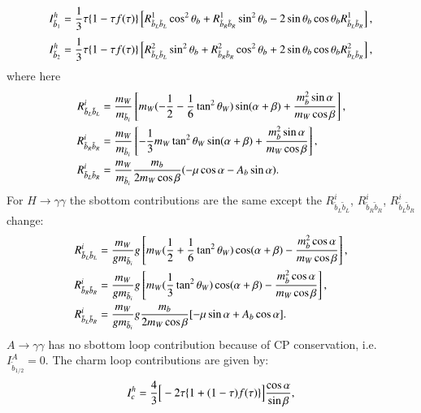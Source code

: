\documentclass[final,3p,times]{elsarticle}
\begin{document}
\begin{equation}
I_{\tilde{b}_1}^h = {1 \over 3}\tau \{1- \tau f(\tau)\}\left[R_{\tilde{b}_L \tilde{b}_L}^1 \cos^2 \theta_b + R_{\tilde{b}_R \tilde{b}_R}^1 \sin^2 \theta_b - 2\sin\theta_b \cos\theta_b R_{\tilde{b}_L \tilde{b}_R}^1\right],
\end{equation}
\begin{equation}
I_{\tilde{b}_2}^h = {1 \over 3}\tau\{1-\tau f(\tau)\}\left[R_{\tilde{b}_L \tilde{b}_L}^2 \sin^2 \theta_b + R_{\tilde{b}_R \tilde{b}_R}^2 \cos^2 \theta_b + 2\sin\theta_b \cos\theta_b R_{\tilde{b}_L \tilde{b}_R}^2\right],
\end{equation}
where here
\begin{align} 
R_{\tilde{b}_L \tilde{b}_L}^i &= {m_{W} \over m_{\tilde{b}_i}} \left[m_W (-{1 \over 2} - {1 \over 6}\tan^2 \theta_W)\sin(\alpha+\beta) + {m_{b}^2 \sin\alpha \over m_{W} \cos \beta}\right], \\
R_{\tilde{b}_R \tilde{b}_R}^i &= {m_{W} \over m_{\tilde{b}_i}}\left[-{1 \over 3}m_W \tan^2 \theta_W \sin(\alpha + \beta) + {m_{b}^2 \sin\alpha \over m_W \cos\beta}\right], \\
R_{\tilde{b}_L \tilde{b}_R}^i &= {m_W \over m_{\tilde{b}_i}}{m_b \over 2m_W \cos\beta}(-\mu \cos\alpha -A_b \sin\alpha).
\end{align}
For $H \rightarrow \gamma \gamma$ the sbottom contributions are the same except the $R_{\tilde{b}_L \tilde{b}_L}^i$, $R_{\tilde{b}_R \tilde{b}_R}^i$, $R_{\tilde{b}_L \tilde{b}_R}^i$ change:
\begin{align}
R_{\tilde{b}_L \tilde{b}_L}^i &= {m_W \over g m_{\tilde{b}_i}}g\left[m_W ({1 \over 2}+{1\over 6}\tan^2 \theta_W)\cos(\alpha+\beta) - {m_{b}^2 \cos\alpha \over m_W \cos\beta}\right], \\
R_{\tilde{b}_R \tilde{b}_R}^i &= {m_W \over g m_{\tilde{b}_i}}g\left[m_W ({1 \over 3}\tan^2 \theta_W)\cos(\alpha+\beta) - {m_{b}^2 \cos\alpha \over m_W \cos\beta}\right], \\
R_{\tilde{b}_L \tilde{b}_R}^i &= {m_W \over g m_{\tilde{b}_i}}g{m_{b} \over 2m_W \cos\beta}[-\mu \sin \alpha + A_b \cos \alpha].
\end{align}
$A \rightarrow \gamma \gamma$ has no sbottom loop contribution because of CP conservation, i.e. $I_{\tilde{b}_{1/2}}^A = 0$.
The charm loop contributions are given by:
\begin{equation}
I_{c}^h = {4 \over 3}\Big[-2\tau\{1+(1-\tau)f(\tau)\}\Big]{\cos\alpha \over \sin\beta},
\end{equation}
\end{document}
